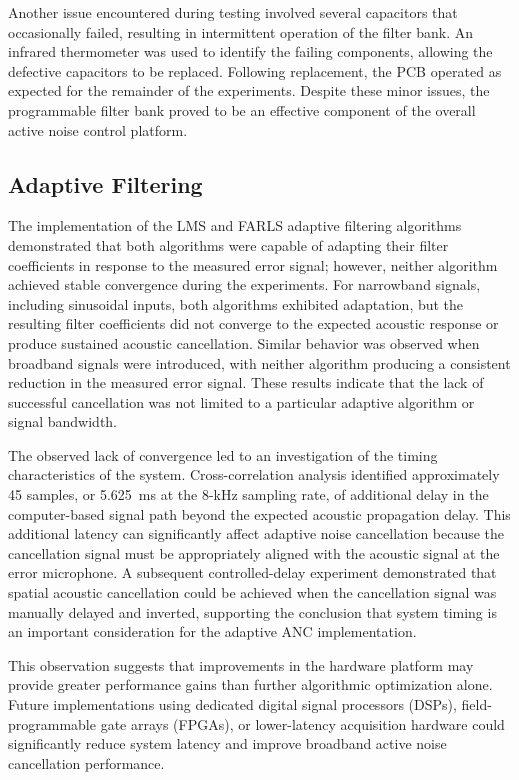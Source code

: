 Another issue encountered during testing involved several capacitors that occasionally failed, resulting in intermittent operation of the filter bank. An infrared thermometer was used to identify the failing components, allowing the defective capacitors to be replaced. Following replacement, the PCB operated as expected for the remainder of the experiments. Despite these minor issues, the programmable filter bank proved to be an effective component of the overall active noise control platform.

\subsection{Adaptive Filtering}

The implementation of the LMS and FARLS adaptive filtering algorithms demonstrated that both algorithms were capable of adapting their filter coefficients in response to the measured error signal; however, neither algorithm achieved stable convergence during the experiments. For narrowband signals, including sinusoidal inputs, both algorithms exhibited adaptation, but the resulting filter coefficients did not converge to the expected acoustic response or produce sustained acoustic cancellation. Similar behavior was observed when broadband signals were introduced, with neither algorithm producing a consistent reduction in the measured error signal. These results indicate that the lack of successful cancellation was not limited to a particular adaptive algorithm or signal bandwidth.

The observed lack of convergence led to an investigation of the timing characteristics of the system. Cross-correlation analysis identified approximately 45 samples, or 5.625~ms at the 8-kHz sampling rate, of additional delay in the computer-based signal path beyond the expected acoustic propagation delay. This additional latency can significantly affect adaptive noise cancellation because the cancellation signal must be appropriately aligned with the acoustic signal at the error microphone. A subsequent controlled-delay experiment demonstrated that spatial acoustic cancellation could be achieved when the cancellation signal was manually delayed and inverted, supporting the conclusion that system timing is an important consideration for the adaptive ANC implementation.

This observation suggests that improvements in the hardware platform may provide greater performance gains than further algorithmic optimization alone. Future implementations using dedicated digital signal processors (DSPs), field-programmable gate arrays (FPGAs), or lower-latency acquisition hardware could significantly reduce system latency and improve broadband active noise cancellation performance.

